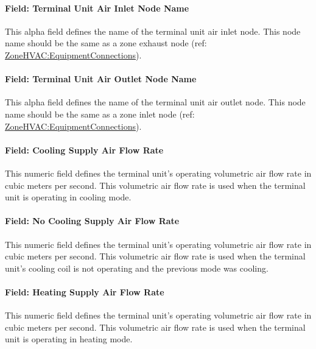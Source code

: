\paragraph{Field: Terminal Unit Air Inlet Node Name}\label{field-terminal-unit-air-inlet-node-name}

This alpha field defines the name of the terminal unit air inlet node. This node name should be the same as a zone exhaust node (ref: \hyperref[zonehvacequipmentconnections]{ZoneHVAC:EquipmentConnections}).

\paragraph{Field: Terminal Unit Air Outlet Node Name}\label{field-terminal-unit-air-outlet-node-name}

This alpha field defines the name of the terminal unit air outlet node. This node name should be the same as a zone inlet node (ref: \hyperref[zonehvacequipmentconnections]{ZoneHVAC:EquipmentConnections}).

\paragraph{Field: Cooling Supply Air Flow Rate}\label{field-cooling-supply-air-flow-rate-3-001}

This numeric field defines the terminal unit's operating volumetric air flow rate in cubic meters per second. This volumetric air flow rate is used when the terminal unit is operating in cooling mode.

\paragraph{Field: No Cooling Supply Air Flow Rate}\label{field-no-cooling-supply-air-flow-rate-000}

This numeric field defines the terminal unit's operating volumetric air flow rate in cubic meters per second. This volumetric air flow rate is used when the terminal unit's cooling coil is not operating and the previous mode was cooling.

\paragraph{Field: Heating Supply Air Flow Rate}\label{field-heating-supply-air-flow-rate-3-001}

This numeric field defines the terminal unit's operating volumetric air flow rate in cubic meters per second. This volumetric air flow rate is used when the terminal unit is operating in heating mode.

